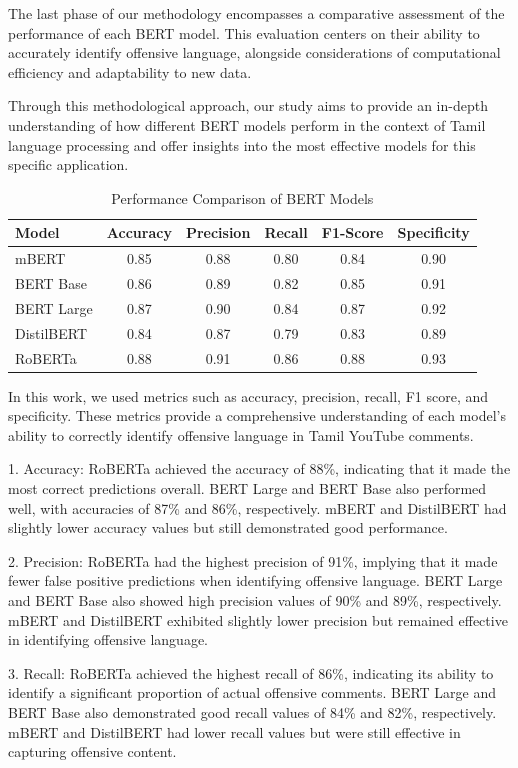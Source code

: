\documentclass{svproc}
\begin{document}
The last phase of our methodology encompasses a comparative assessment of the performance of each BERT model. This evaluation centers on their ability to accurately identify offensive language, alongside considerations of computational efficiency and adaptability to new data.

Through this methodological approach, our study aims to provide an in-depth understanding of how different BERT models perform in the context of Tamil language processing and offer insights into the most effective models for this specific application.

\begin{table}[h]
\caption{Performance Comparison of BERT Models}
\centering
\begin{tabular}{|l|c|c|c|c|c|}
\hline
\textbf{Model} & \textbf{Accuracy} & \textbf{Precision} & \textbf{Recall} & \textbf{F1-Score} & \textbf{Specificity} \\
\hline
mBERT & 0.85 & 0.88 & 0.80 & 0.84 & 0.90 \\
BERT Base & 0.86 & 0.89 & 0.82 & 0.85 & 0.91 \\
BERT Large & 0.87 & 0.90 & 0.84 & 0.87 & 0.92 \\
DistilBERT & 0.84 & 0.87 & 0.79 & 0.83 & 0.89 \\
RoBERTa & 0.88 & 0.91 & 0.86 & 0.88 & 0.93 \\
\hline
\end{tabular}
\end{table}

In this work, we used metrics such as accuracy, precision, recall, F1 score, and specificity. These metrics provide a comprehensive understanding of each model's ability to correctly identify offensive language in Tamil YouTube comments.


1. Accuracy: RoBERTa achieved the accuracy of 88\%, indicating that it made the most correct predictions overall. BERT Large and BERT Base also performed well, with accuracies of 87\% and 86\%, respectively. mBERT and DistilBERT had slightly lower accuracy values but still demonstrated good performance.

2. Precision: RoBERTa had the highest precision of 91\%, implying that it made fewer false positive predictions when identifying offensive language. BERT Large and BERT Base also showed high precision values of 90\% and 89\%, respectively. mBERT and DistilBERT exhibited slightly lower precision but remained effective in identifying offensive language.

3. Recall: RoBERTa achieved the highest recall of 86\%, indicating its ability to identify a significant proportion of actual offensive comments. BERT Large and BERT Base also demonstrated good recall values of 84\% and 82\%, respectively. mBERT and DistilBERT had lower recall values but were still effective in capturing offensive content.
\end{document}
